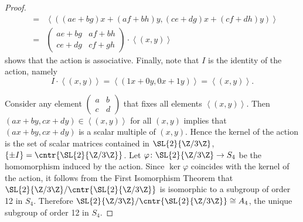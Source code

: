 \documentclass[10pt]{amsart}
\begin{document}
\begin{thm}
\begin{proof}
\begin{eqnarray*}
    &=& \left<((ae + bg)x + (af + bh)y, (ce + dg)x + (cf + dh)y)\right>\\
    &=& \left(\begin{array}{cc}
        ae + bg & af + bh\\
        ce + dg & cf + gh
      \end{array}\right)\cdot\left<(x,y)\right>
    \end{eqnarray*}
    shows that the action is associative.
    Finally, note that $I$ is the identity of the action, namely $$I\cdot\left<(x,y)\right> = \left<(1x + 0y,0x + 1y)\right> = \left<(x,y)\right>.$$
    
    Consider any element $\left(\begin{array}{cc}
      a & b\\
      c & d
    \end{array}\right)$
    that fixes all elements $\left<(x,y)\right>$.
    Then $(ax + by, cx + dy) \in \left<(x,y)\right>$ for all $(x,y)$ implies that $(ax + by, cx + dy)$ is a scalar multiple of $(x,y)$.
    Hence the kernel of the action is the set of scalar matrices contained in $\SL{2}{\Z/3\Z}$, $\left\{\pm I\right\} = \cntr{\SL{2}{\Z/3\Z}}$.
    Let $\varphi \colon \SL{2}{\Z/3\Z} \rightarrow S_4$ be the homomorphism induced by the action.
    Since $\ker\varphi$ coincides with the kernel of the action, it follows from the First Isomorphism Theorem that $\SL{2}{\Z/3\Z}/\cntr{\SL{2}{\Z/3\Z}}$ is isomorphic to a subgroup of order 12 in $S_4$.
    Therefore $\SL{2}{\Z/3\Z}/\cntr{\SL{2}{\Z/3\Z}} \cong A_4$, the unique subgroup of order 12 in $S_4$.
  \end{proof}
\end{thm}
\end{document}
